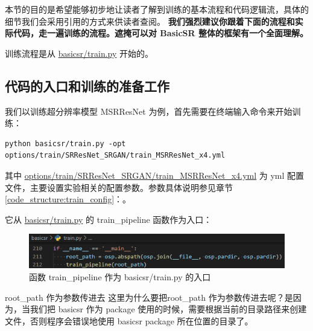 \documentclass[../main.tex]{subfiles}
\begin{document}
本节的目的是希望能够初步地让读者了解到训练的基本流程和代码逻辑流，具体的细节我们会采用引用的方式来供读者查阅。
\textbf{我们强烈建议你跟着下面的流程和实际代码，走一遍训练的流程。遮掩可以对 BasicSR 整体的框架有一个全面理解。}

训练流程是从 \href{https://github.com/XPixelGroup/BasicSR/blob/master/basicsr/train.py}{basicsr/train.py} 开始的。

\subsection{代码的入口和训练的准备工作}\label{getting_start:entrance}
我们以训练超分辨率模型 MSRResNet 为例，首先需要在终端输入命令来开始训练：

\begin{verbatim}
python basicsr/train.py -opt options/train/SRResNet_SRGAN/train_MSRResNet_x4.yml
\end{verbatim}

其中 \href{https://github.com/XPixelGroup/BasicSR/blob/master/options/train/SRResNet\_SRGAN/train\_MSRResNet\_x4.yml}{options/train/SRResNet\_SRGAN/train\_MSRResNet\_x4.yml} 为 yml 配置文件，主要设置实验相关的配置参数。参数具体说明参见章节\ref{code_structure:train_config}：。

它从 \href{https://github.com/XPixelGroup/BasicSR/blob/master/basicsr/train.py}{basicsr/train.py} 的 train\_pipeline 函数作为入口：

\begin{figure}[h]
    \begin{center}
        \vspace{-0.2cm}
        \includegraphics[width=0.85\linewidth]{figures/getting_start_train_entracne.png}
        \vspace{-0.3cm}
        \caption{函数 train\_pipeline 作为 basicsr/train.py 的入口}
        \label{fig:getting_start_train_entracne}
    \end{center}
    \vspace{-0.5cm}
\end{figure}

\begin{exampleBox}[righthand ratio=0.00, sidebyside, sidebyside align=center, lower separated=false]{root\_path 作为参数传进去}
    这里为什么要把root\_path 作为参数传进去呢？是因为，当我们把 basicsr 作为 package 使用的时候，需要根据当前的目录路径来创建文件，否则程序会错误地使用 basicsr package 所在位置的目录了。
\end{exampleBox}
\end{document}
